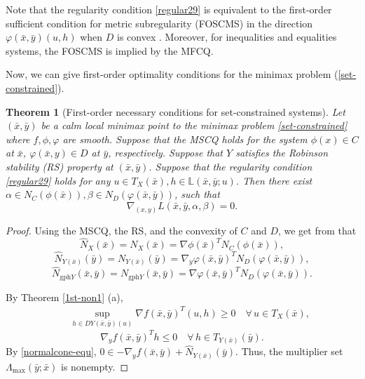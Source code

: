 \documentclass[11pt]{article}
\numberwithin{equation}{section}
\newtheorem{theorem}{Theorem}[section]
\begin{document}
{Note that the regularity condition \eqref{regular29} is equivalent to the first-order sufficient condition for metric subregularity (FOSCMS) in the direction $\varphi(\bar{x},\bar y)(u,h)$ when $D$ is convex \cite[Remark 4.1]{BaiYe2023}. Moreover, for inequalities and equalities systems, the FOSCMS is implied by the MFCQ.


Now, we can give first-order optimality conditions for the minimax problem  (\ref{set-constrained}).
  \begin{theorem}[First-order necessary conditions for set-constrained systems]\label{set-first}Let $(\bar x, \bar y)$ be a calm local minimax point to the minimax problem \eqref{set-constrained} where $f,\phi, \varphi$ are smooth. Suppose that the MSCQ holds for the system $\phi(x)\in C$ at $\bar x$, $\varphi(\bar x,y)\in D$ at $\bar y$, respectively. Suppose that $Y$ satisfies the Robinson stability (RS) property at $(\bar x,\bar y)$.  Suppose that the regularity condition \eqref{regular29} holds for any $u \in T_{ X}(\bar x), h \in \mathbb{L}(\bar x,\bar y;u)$. Then there exist $\alpha \in N_C(\phi(\bar x)), \beta \in N_D(\varphi(\bar x,\bar y))$,  such that
\begin{equation*}
\nabla_{(x,y)} L(\bar x,\bar y,\alpha,\beta) =0.
\end{equation*}
   \end{theorem}

\begin{proof}
 Using the MSCQ, the RS, and the convexity of $C$ and $D$, we get from \cite[Proposition 4.2]{ABM21} that
$$\widehat N_X(\bar x) = N_X(\bar x) = \nabla \phi(\bar x)^T N_C(\phi(\bar x)),$$
$$\widehat N_{Y(\bar x)}(\bar y) = N_{Y(\bar x)}(\bar y) = \nabla_y \varphi(\bar x,\bar y)^T N_D(\varphi(\bar x,\bar y)),$$
\begin{equation}\label{normaly}\widehat{N}_{\mathrm{gph} Y}(\bar{x}, \bar{y}) = N_{\mathrm{gph} Y}(\bar{x}, \bar{y}) = \nabla \varphi(\bar x,\bar y)^T N_D(\varphi(\bar x,\bar y)).\end{equation}

By Theorem \ref{1st-non1} (a), 
\begin{eqnarray*}
&& \sup_{h \in D Y(\bar x,\bar y)(u)} \nabla f(\bar{x}, \bar{y})^T(u,h) \geq 0 \quad \forall\, u \in T_X(\bar{x}),
\end{eqnarray*}
\begin{equation*}
\nabla_y f(\bar{x}, \bar{y})^Th \leq 0\quad \forall\, h \in T_{Y(\bar x)}(\bar{y}).
\end{equation*}
By \eqref{normalcone-equ}, $0 \in -\nabla_y f(\bar{x}, \bar{y}) + \widehat N_{Y(\bar x)}(\bar y)$. Thus, the multiplier set $\Lambda_{\max}(\bar y;\bar x)$ is nonempty.


\end{proof}}
\end{document}
